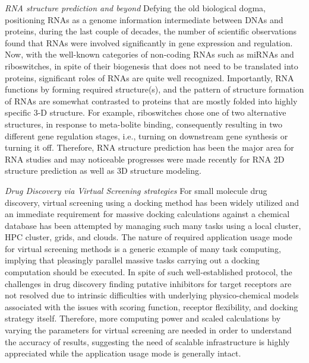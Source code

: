 \documentclass{sig-alternate}
\begin{document}
\textit{RNA structure prediction and beyond}
Defying the old biological dogma, positioning RNAs as a genome information intermediate between DNAs and proteins, during the last couple of decades, the number of scientific observations found that RNAs were involved significantly in gene expression and regulation\cite{joyce1999,cruz2009,encode2007,amaral2008}.  Now, with the well-known categories of non-coding RNAs such as miRNAs and riboswitches, in spite of their biogenesis that does not need to be translated into proteins, significant roles of RNAs are quite well recognized\cite{costa2009,ellington2007,baek2008,blouin2009,henkin2009}.  Importantly, RNA functions by forming required structure(s), and the pattern of structure formation of RNAs are somewhat contrasted to proteins that are mostly folded into highly specific 3-D structure\cite{roth2009}. For example, riboswitches chose one of two alternative structures, in response to meta-bolite binding, consequently resulting in two different gene regulation stages, i.e., turning on downstream gene synthesis or turning it off\cite{montange2008,dambach2009,weinberg2007}.  Therefore, RNA structure prediction has been the major area for RNA studies and may noticeable progresses were made recently for RNA 2D structure prediction as well as 3D structure modeling\cite{shapiro2007,mathews2006,ding2003}.   

\textit{Drug Discovery via Virtual Screening strategies}
For small molecule drug discovery, virtual screening using a docking method has been widely utilized and an immediate requirement for massive docking calculations against a chemical database has been attempted by managing such many tasks using a local cluster, HPC cluster, grids, and clouds\cite{levesque2009,yim2010}.  The nature of required application usage mode for virtual screening methods is a generic example of many task computing, implying that pleasingly parallel massive tasks carrying out a docking computation should be executed.  In spite of such well-established protocol, the challenges in drug discovery finding putative inhibitors for target receptors are not resolved due to intrinsic difficulties with underlying physico-chemical models associated with the issues with scoring function, receptor flexibility, and docking strategy itself\cite{amaro2010}.  Therefore, more computing power and scaled calculations by varying the parameters for virtual screening are needed in order to understand the accuracy of results, suggesting the need of scalable infrastructure is highly appreciated while the application usage mode is generally intact.   
\end{document}
